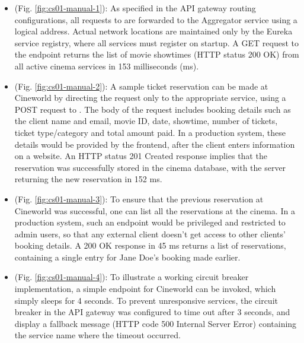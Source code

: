 \begin{itemize}
  \item {} (Fig. \ref{fig:cs01-manual-1}): As specified in the API gateway routing configurations, all requests to  are forwarded to the Aggregator service using a logical address. Actual network locations are maintained only by the Eureka service registry, where all services must register on startup. A GET request to the  endpoint returns the list of movie showtimes (HTTP status 200 OK) from all active cinema services in 153 milliseconds (ms).

  \item {} (Fig. \ref{fig:cs01-manual-2}): A sample ticket reservation can be made at Cineworld by directing the request only to the appropriate service, using a POST request to . The body of the request includes booking details such as the client name and email, movie ID, date, showtime, number of tickets, ticket type/category and total amount paid. In a production system, these details would be provided by the frontend, after the client enters information on a website. An HTTP status 201 Created response implies that the reservation was successfully stored in the cinema database, with the server returning the new reservation in 152 ms.

  \item {} (Fig. \ref{fig:cs01-manual-3}): To ensure that the previous reservation at Cineworld was successful, one can list all the reservations at the cinema. In a production system, such an endpoint would be privileged and restricted to admin users, so that any external client doesn't get access to other clients' booking details. A 200 OK response in 45 ms returns a list of reservations, containing a single entry for Jane Doe's booking made earlier.

  \item {} (Fig. \ref{fig:cs01-manual-4}): To illustrate a working circuit breaker implementation, a simple  endpoint for Cineworld can be invoked, which simply sleeps for 4 seconds. To prevent unresponsive services, the circuit breaker in the API gateway was configured to time out after 3 seconds, and display a fallback message (HTTP code 500 Internal Server Error) containing the service name where the timeout occurred.
\end{itemize}


